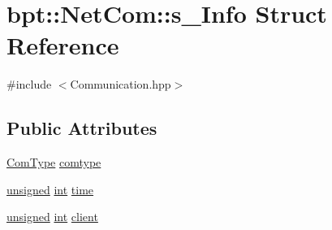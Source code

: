 \hypertarget{structbpt_1_1_net_com_1_1s___info}{\section{bpt\-:\-:Net\-Com\-:\-:s\-\_\-\-Info Struct Reference}
\label{structbpt_1_1_net_com_1_1s___info}
}


{\ttfamily \#include $<$Communication.\-hpp$>$}

\subsection*{Public Attributes}
\begin{DoxyCompactItemize}
\item 
\hyperlink{namespacebpt_1_1_net_com_a73b47b2b099bf7d28997dc72c921212c}{Com\-Type} \hyperlink{structbpt_1_1_net_com_1_1s___info_a04de21638bff33bd3459fc95e34f07c7}{comtype}
\item 
\hyperlink{curses_8priv_8h_aca40206900cfc164654362fa8d4ad1e6}{unsigned} \hyperlink{term__entry_8h_ad65b480f8c8270356b45a9890f6499ae}{int} \hyperlink{structbpt_1_1_net_com_1_1s___info_ad76e1792d9b3057751a844b1fffbb635}{time}
\item 
\hyperlink{curses_8priv_8h_aca40206900cfc164654362fa8d4ad1e6}{unsigned} \hyperlink{term__entry_8h_ad65b480f8c8270356b45a9890f6499ae}{int} \hyperlink{structbpt_1_1_net_com_1_1s___info_ae2ea56fb236b6a24a720751e0b70b1d1}{client}
\end{DoxyCompactItemize}


